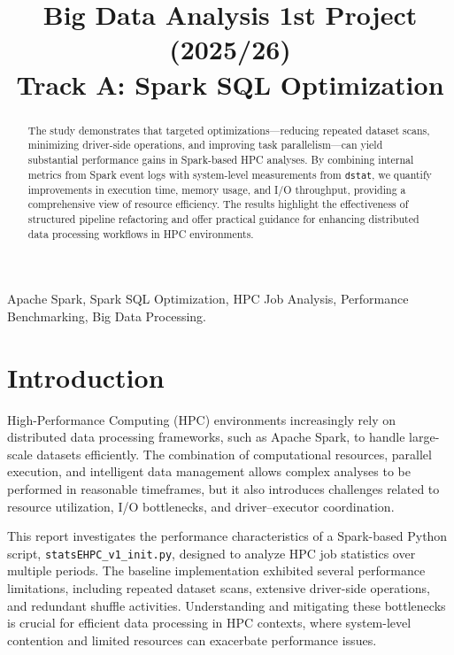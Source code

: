 \documentclass[conference,a4paper]{IEEEtran}
\begin{document}
\title{Big Data Analysis 1st Project (2025/26)\\
       \Large Track A: Spark SQL Optimization}

\author{
    \and
    \and
}

\maketitle

\begin{abstract}
The study demonstrates that targeted optimizations—reducing repeated dataset scans,
minimizing driver-side operations, and improving task parallelism—can yield
substantial performance gains in Spark-based HPC analyses. By combining internal
metrics from Spark event logs with system-level measurements from \texttt{dstat},
we quantify improvements in execution time, memory usage, and I/O throughput,
providing a comprehensive view of resource efficiency. The results highlight the
effectiveness of structured pipeline refactoring and offer practical guidance for
enhancing distributed data processing workflows in HPC environments.
\end{abstract}

\begin{IEEEkeywords}
Apache Spark, Spark SQL Optimization, HPC Job Analysis, Performance Benchmarking, Big Data Processing.
\end{IEEEkeywords}

\section{Introduction}
\label{sec:introduction}

High-Performance Computing (HPC) environments increasingly rely on distributed
data processing frameworks, such as Apache Spark, to handle large-scale datasets
efficiently. The combination of computational resources, parallel execution, and
intelligent data management allows complex analyses to be performed in reasonable
timeframes, but it also introduces challenges related to resource utilization,
I/O bottlenecks, and driver–executor coordination.

This report investigates the performance characteristics of a Spark-based Python
script, \texttt{statsEHPC\_v1\_init.py}, designed to analyze HPC job statistics
over multiple periods. The baseline implementation exhibited several performance
limitations, including repeated dataset scans, extensive driver-side operations,
and redundant shuffle activities. Understanding and mitigating these bottlenecks
is crucial for efficient data processing in HPC contexts, where system-level
contention and limited resources can exacerbate performance issues.
\end{document}
